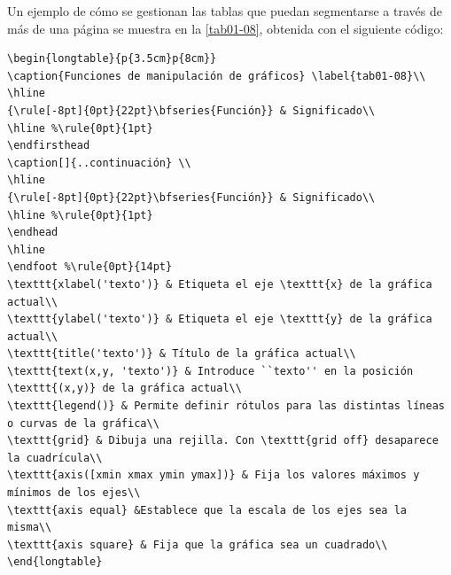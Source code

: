 Un ejemplo de cómo se gestionan las tablas que puedan segmentarse a través de más de una página se muestra en la \autoref{tab01-08}, obtenida con el siguiente código:
%
\begin{lstlisting}[frame=none]
\begin{longtable}{p{3.5cm}p{8cm}}
\caption{Funciones de manipulación de gráficos} \label{tab01-08}\\
\hline
{\rule[-8pt]{0pt}{22pt}\bfseries{Función}} & Significado\\
\hline %\rule{0pt}{1pt}
\endfirsthead
\caption[]{..continuación} \\
\hline
{\rule[-8pt]{0pt}{22pt}\bfseries{Función}} & Significado\\
\hline %\rule{0pt}{1pt}
\endhead
\hline
\endfoot %\rule{0pt}{14pt}
\texttt{xlabel('texto')} & Etiqueta el eje \texttt{x} de la gráfica actual\\ 
\texttt{ylabel('texto')} & Etiqueta el eje \texttt{y} de la gráfica actual\\ 
\texttt{title('texto')} & Título de la gráfica actual\\ 
\texttt{text(x,y, 'texto')} & Introduce ``texto'' en la posición \texttt{(x,y)} de la gráfica actual\\ 
\texttt{legend()} & Permite definir rótulos para las distintas líneas o curvas de la gráfica\\ 
\texttt{grid} & Dibuja una rejilla. Con \texttt{grid off} desaparece la cuadrícula\\ 
\texttt{axis([xmin xmax ymin ymax])} & Fija los valores máximos y mínimos de los ejes\\ 
\texttt{axis equal} &Establece que la escala de los ejes sea la misma\\ 
\texttt{axis square} & Fija que la gráfica sea un cuadrado\\ 
\end{longtable}
\end{lstlisting}
%
%
